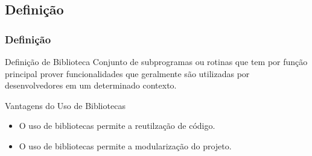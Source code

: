  \subsection{Definição}
 \begin{frame}
  \frametitle{Definição}

  \begin{block}{Definição de Biblioteca}
    Conjunto de subprogramas ou rotinas que tem por função principal prover funcionalidades que geralmente são
    utilizadas por desenvolvedores em um determinado contexto.
  \end{block}

  \begin{block}{Vantagens do Uso de Bibliotecas}

    \begin{itemize}

     \item O uso de bibliotecas permite a reutilzação de código.

     \item O uso de bibliotecas permite a modularização do projeto.

    \end{itemize}

  \end{block}

\end{frame}


